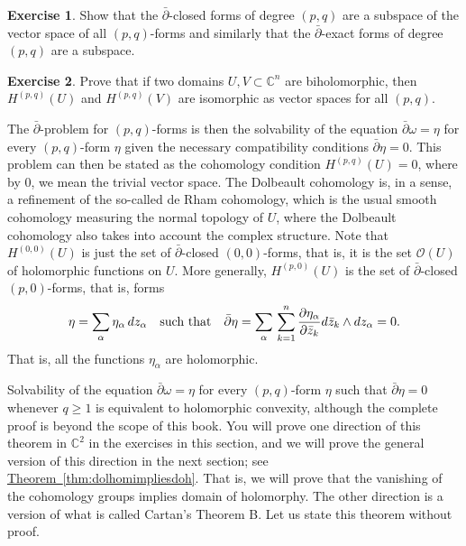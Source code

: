 \documentclass[12pt,openany]{book}
\newcommand{\avoidbreak}{\postdisplaypenalty=100}
\newcommand{\C}{{\mathbb{C}}}
\newcommand{\sO}{{\mathscr{O}}}
\theoremstyle{plain}
\theoremstyle{remark}
\theoremstyle{definition}
\newenvironment{exbox}{%
    \def\FrameCommand{\vrule width 1pt \relax\hspace{10pt}}%
    \MakeFramed{\advance\hsize-\width\FrameRestore}%
}{%
    \endMakeFramed
}
\theoremstyle{exercise}
\newtheorem{exercise}{Exercise}[section]
\theoremstyle{example}
\newcommand{\thmref}[1]{\hyperref[#1]{Theorem~\ref*{#1}}}
\begin{document}
\begin{exbox}
\begin{exercise}
Show that the $\bar{\partial}$-closed forms of degree $(p,q)$
are a subspace of the vector space of all $(p,q)$-forms and similarly
that the
$\bar{\partial}$-exact forms of degree $(p,q)$
are a subspace.
\end{exercise}

\begin{exercise}
Prove that if two domains $U,V \subset \C^n$ are biholomorphic,
then $H^{(p,q)}(U)$ and $H^{(p,q)}(V)$
are isomorphic as vector spaces for all $(p,q)$.
\end{exercise}
\end{exbox}

The $\bar{\partial}$-problem for $(p,q)$-forms is then the solvability
of the equation $\bar{\partial} \omega = \eta$ for every $(p,q)$-form
$\eta$ given the necessary
compatibility conditions $\bar{\partial} \eta = 0$.
This problem
can then be stated as the cohomology condition $H^{(p,q)}(U) = 0$,
where by $0$, we mean the trivial vector space.
The Dolbeault cohomology is, in a sense, a refinement
of the so-called de Rham cohomology,
which is the usual smooth cohomology measuring the normal topology of $U$,
where the Dolbeault cohomology also takes into account the complex structure.
Note that $H^{(0,0)}(U)$ is just the set of $\bar{\partial}$-closed
$(0,0)$-forms, that is, it is the set $\sO(U)$ of holomorphic functions on $U$.
More generally, $H^{(p,0)}(U)$ is the set of $\bar{\partial}$-closed
$(p,0)$-forms, that is, forms
\begin{equation*}
\eta =
\sum_{\alpha}
\eta_{\alpha} \, dz_\alpha
\quad \text{such that}
\quad
\bar{\partial} \eta
=
\sum_{\alpha}
\,
\sum_{k=1}^n
\frac{\partial \eta_{\alpha}}{\partial \bar{z}_k} d\bar{z}_k \wedge
dz_\alpha = 0.
\avoidbreak
\end{equation*}
That is, all the functions $\eta_{\alpha}$ are holomorphic.

Solvability of the equation $\bar{\partial} \omega = \eta$ for every $(p,q)$-form
$\eta$ such that $\bar{\partial} \eta = 0$ whenever $q \geq 1$
is equivalent to holomorphic convexity, although
the complete proof is beyond the scope of this book.  You will prove
one direction of this theorem in $\C^2$ in the exercises in this section,
and we will prove the general version of this direction in the next section;
see \thmref{thm:dolhomimpliesdoh}.  That is, we will prove that
the vanishing of the cohomology groups implies domain of holomorphy.
The other direction is a version of what is called Cartan's Theorem B.
Let us state this theorem without proof.
\end{document}
